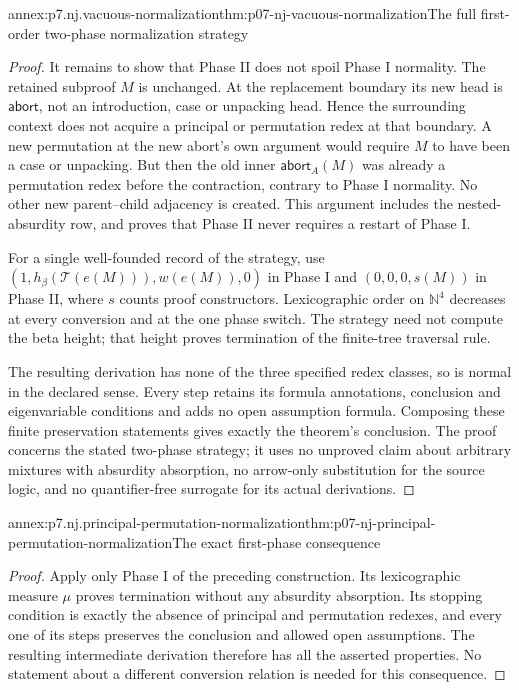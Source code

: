 \begin{annexitem}{annex:p7.nj.vacuous-normalization}{thm:p07-nj-vacuous-normalization}{The full first-order two-phase normalization strategy}
\begin{proof}
It remains to show that Phase II does not spoil Phase I
normality. The retained subproof \(M\) is unchanged.
At the replacement boundary its new head is
\(\mathsf{abort}\), not an introduction, case or unpacking
head. Hence the surrounding context does not acquire a
principal or permutation redex at that boundary. A new
permutation at the new abort's own argument would require
\(M\) to have been a case or unpacking. But then the old
inner \(\mathsf{abort}_A(M)\) was already a permutation
redex before the contraction, contrary to Phase I normality.
No other new parent--child adjacency is created. This
argument includes the nested-absurdity row, and proves that
Phase II never requires a restart of Phase I.

For a single well-founded record of the strategy, use
\((1,h_\beta(\mathcal T(e(M))),w(e(M)),0)\) in Phase I
and \((0,0,0,s(M))\) in Phase II, where \(s\) counts
proof constructors. Lexicographic order on \(\mathbb N^4\)
decreases at every conversion and at the one phase switch.
The strategy need not compute the beta height; that height
proves termination of the finite-tree traversal rule.

The resulting derivation has none of the three specified
redex classes, so is normal in the declared sense. Every
step retains its formula annotations, conclusion and
eigenvariable conditions and adds no open assumption
formula. Composing these finite preservation statements
gives exactly the theorem's conclusion. The proof concerns
the stated two-phase strategy; it uses no unproved claim
about arbitrary mixtures with absurdity absorption, no
arrow-only substitution for the source logic, and no
quantifier-free surrogate for its actual derivations.
\end{proof}
\end{annexitem}

\begin{annexitem}{annex:p7.nj.principal-permutation-normalization}{thm:p07-nj-principal-permutation-normalization}{The exact first-phase consequence}
\begin{proof}
Apply only Phase I of the preceding construction. Its
lexicographic measure \(\mu\) proves termination without
any absurdity absorption. Its stopping condition is exactly
the absence of principal and permutation redexes, and every
one of its steps preserves the conclusion and allowed open
assumptions. The resulting intermediate derivation therefore
has all the asserted properties. No statement about a
different conversion relation is needed for this consequence.
\end{proof}
\end{annexitem}
